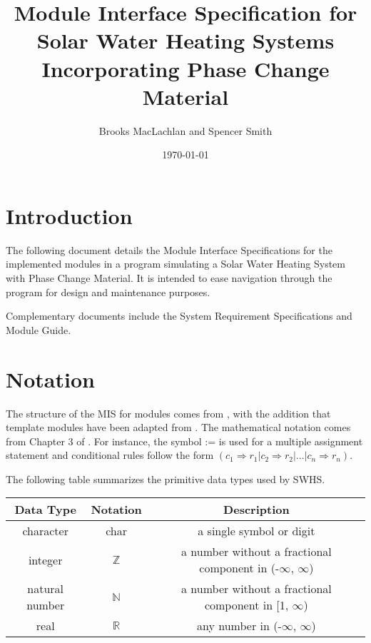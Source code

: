\documentclass[12pt]{article}
\newcommand{\progname}{SWHS}
\begin{document}
\title{Module Interface Specification for Solar Water Heating Systems
  Incorporating Phase Change Material}

\author{Brooks MacLachlan and Spencer Smith}

\date{\today}

\maketitle

\tableofcontents

\section{Introduction}

The following document details the Module Interface Specifications for the
implemented modules in a program simulating a Solar Water Heating System with
Phase Change Material.  It is intended to ease navigation through the program
for design and maintenance purposes.

Complementary documents include the System Requirement Specifications and Module
Guide.

\section{Notation}

The structure of the MIS for modules comes from \citet{HoffmanAndStrooper1995},
with the addition that template modules have been adapted from
\cite{GhezziEtAl2003}.  The mathematical notation comes from Chapter 3 of
\citet{HoffmanAndStrooper1995}.  For instance, the symbol := is used for a
multiple assignment statement and conditional rules follow the form $(c_1
\Rightarrow r_1 | c_2 \Rightarrow r_2 | ... | c_n \Rightarrow r_n )$.

The following table summarizes the primitive data types used by \progname. 

\begin{center}
\renewcommand{\arraystretch}{1.2}
\noindent 
\begin{tabular}{c c c} 
\toprule 
\textbf{Data Type} & \textbf{Notation} & \textbf{Description}\\ 
\midrule
character & char & a single symbol or digit\\
integer & $\mathbb{Z}$ & a number without a fractional component in (-$\infty$, $\infty$) \\
natural number & $\mathbb{N}$ & a number without a fractional component in [1, $\infty$) \\
real & $\mathbb{R}$ & any number in (-$\infty$, $\infty$)\\
\bottomrule
\end{tabular} 
\end{center}
\end{document}

